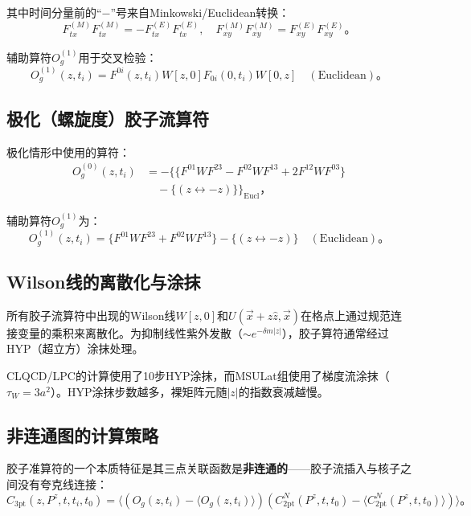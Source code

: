 \documentclass[12pt,a4paper]{ctexart}
\theoremstyle{definition}
\begin{document}
其中时间分量前的``$-$''号来自Minkowski/Euclidean转换：
\begin{equation}
F^{(M)}_{tx}F^{(M)}_{tx} = -F^{(E)}_{tx}F^{(E)}_{tx}, \quad F^{(M)}_{xy}F^{(M)}_{xy} = F^{(E)}_{xy}F^{(E)}_{xy}。
\end{equation}

辅助算符$O^{(1)}_g$用于交叉检验：
\begin{equation}
O^{(1)}_g(z, t_i) = F^{0i}(z,t_i)W[z,0]F_{0i}(0,t_i)W[0,z] \quad (\text{Euclidean})。
\end{equation}

\subsection{极化（螺旋度）胶子流算符}

极化情形中使用的算符\cite{NoteGluonPDFs}：
\begin{equation}
\begin{aligned}
O^{(0)}_g(z, t_i) &= -\Big\{ \{F^{01}W F^{23} - F^{02}W F^{13} + 2F^{12}W F^{03}\} \\
&\quad - \{ (z \leftrightarrow -z) \} \Big\}_{\text{Eucl}}，
\end{aligned}
\label{eq:pol_gluon_current}
\end{equation}

辅助算符$O^{(1)}_g$为：
\begin{equation}
O^{(1)}_g(z, t_i) = \{F^{01}W F^{23} + F^{02}W F^{13}\} - \{ (z \leftrightarrow -z) \} \quad (\text{Euclidean})。
\end{equation}

\subsection{Wilson线的离散化与涂抹}

所有胶子流算符中出现的Wilson线$W[z,0]$和$U(\vec{x}+z\hat{z}, \vec{x})$在格点上通过规范连接变量的乘积来离散化。为抑制线性紫外发散（$\sim e^{-\delta m|z|}$），胶子算符通常经过HYP（超立方）涂抹处理。

CLQCD/LPC的计算使用了10步HYP涂抹，而MSULat组使用了梯度流涂抹（$\tau_W=3a^2$）。HYP涂抹步数越多，裸矩阵元随$|z|$的指数衰减越慢。

\subsection{非连通图的计算策略}

胶子准算符的一个本质特征是其三点关联函数是\textbf{非连通的}——胶子流插入与核子之间没有夸克线连接\cite{Chen2025gluon,NoteGluonPDFs}：
\begin{equation}
C_{\text{3pt}}(z, P^z, t, t_i, t_0) = \langle (O_g(z, t_i) - \langle O_g(z, t_i) \rangle)(C^N_{\text{2pt}}(P^z, t, t_0) - \langle C^N_{\text{2pt}}(P^z, t, t_0) \rangle) \rangle。
\label{eq:disconnected_3pt}
\end{equation}
\end{document}
